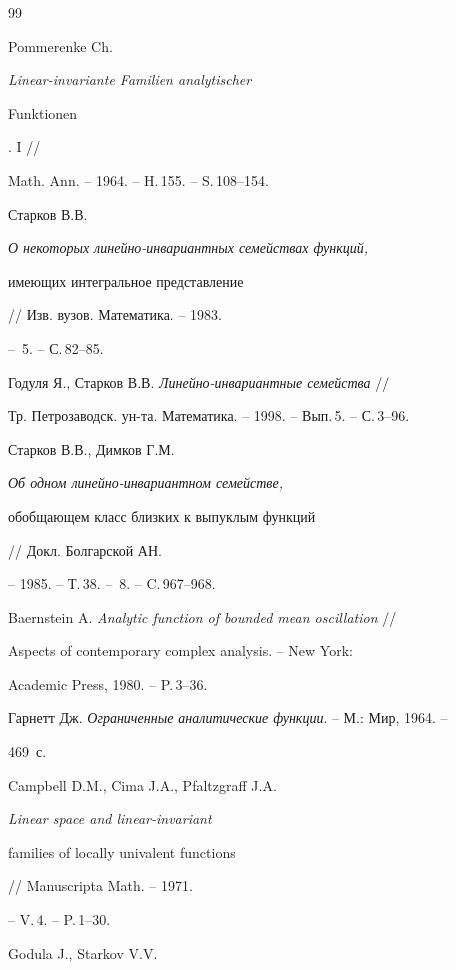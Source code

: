 \begin{thebibliography}{99}







Pommerenke Ch. {\em Linear-invariante Familien analytischer


Funktionen}. I //


Math. Ann. -- 1964. -- H.\,155. -- S.\,108--154.




Старков В.В. {\em О некоторых линейно-инвариантных семействах функций,


имеющих интегральное представление} // Изв. вузов. Математика. -- 1983.


-- \No\,5. -- С.\,82--85.




Годуля Я., Старков В.В. {\em Линейно-инвариантные семейства} //


Тр. Петрозаводск. ун-та. Математика. -- 1998. -- Вып.\,5. -- С.\,3--96.




Старков В.В., Димков Г.М. {\em Об одном линейно-инвариантном семействе,


обобщающем класс близких к выпуклым функций} // Докл. Болгарской АН.


-- 1985. -- Т.\,38. -- \No\,8. -- C.\,967--968.




Baernstein A. {\em Analytic function of bounded mean oscillation} //


Aspects of contemporary complex analysis. -- New York:




Academic Press, 1980. -- P.\,3--36.




Гарнетт Дж. {\em Ограниченные аналитические функции}. -- М.: Мир, 1964. --


469~с.




Campbell D.M., Cima J.A., Pfaltzgraff J.A.


{\em Linear space and linear-invariant


families of locally univalent functions} // Manuscripta Math. -- 1971.


-- V.\,4. -- P.\,1--30.




Godula J., Starkov V.V.



\end{thebibliography}
